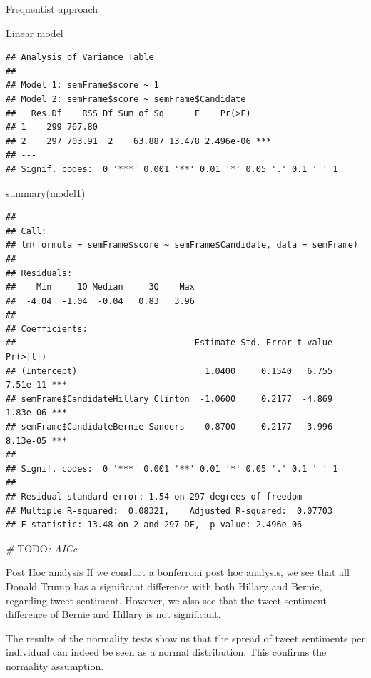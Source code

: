 \documentclass[
  ignorenonframetext,
]{beamer}
\newenvironment{Shaded}{\begin{snugshade}}{\end{snugshade}}
\newcommand{\AlertTok}[1]{\textcolor[rgb]{0.94,0.16,0.16}{#1}}
\newcommand{\CommentTok}[1]{\textcolor[rgb]{0.56,0.35,0.01}{\textit{#1}}}
\newcommand{\FunctionTok}[1]{\textcolor[rgb]{0.00,0.00,0.00}{#1}}
\newcommand{\NormalTok}[1]{#1}
\begin{document}
\begin{frame}[fragile]{Frequentist approach}
\begin{block}{Linear model}
\begin{verbatim}
## Analysis of Variance Table
## 
## Model 1: semFrame$score ~ 1
## Model 2: semFrame$score ~ semFrame$Candidate
##   Res.Df    RSS Df Sum of Sq      F    Pr(>F)    
## 1    299 767.80                                  
## 2    297 703.91  2    63.887 13.478 2.496e-06 ***
## ---
## Signif. codes:  0 '***' 0.001 '**' 0.01 '*' 0.05 '.' 0.1 ' ' 1
\end{verbatim}

\begin{Shaded}
\begin{Highlighting}[]
\FunctionTok{summary}\NormalTok{(model1)}
\end{Highlighting}
\end{Shaded}

\begin{verbatim}
## 
## Call:
## lm(formula = semFrame$score ~ semFrame$Candidate, data = semFrame)
## 
## Residuals:
##    Min     1Q Median     3Q    Max 
##  -4.04  -1.04  -0.04   0.83   3.96 
## 
## Coefficients:
##                                   Estimate Std. Error t value Pr(>|t|)    
## (Intercept)                         1.0400     0.1540   6.755 7.51e-11 ***
## semFrame$CandidateHillary Clinton  -1.0600     0.2177  -4.869 1.83e-06 ***
## semFrame$CandidateBernie Sanders   -0.8700     0.2177  -3.996 8.13e-05 ***
## ---
## Signif. codes:  0 '***' 0.001 '**' 0.01 '*' 0.05 '.' 0.1 ' ' 1
## 
## Residual standard error: 1.54 on 297 degrees of freedom
## Multiple R-squared:  0.08321,    Adjusted R-squared:  0.07703 
## F-statistic: 13.48 on 2 and 297 DF,  p-value: 2.496e-06
\end{verbatim}

\begin{Shaded}
\begin{Highlighting}[]
\CommentTok{\# }\AlertTok{TODO}\CommentTok{: AICc}
\end{Highlighting}
\end{Shaded}
\end{block}

\begin{block}{Post Hoc analysis}
\protect\hypertarget{post-hoc-analysis}{}
If we conduct a bonferroni post hoc analysis, we see that all Donald
Trump has a significant difference with both Hillary and Bernie,
regarding tweet sentiment. However, we also see that the tweet sentiment
difference of Bernie and Hillary is not significant.

The results of the normality tests show us that the spread of tweet
sentiments per individual can indeed be seen as a normal distribution.
This confirms the normality assumption.


\end{block}
\end{frame}
\end{document}
